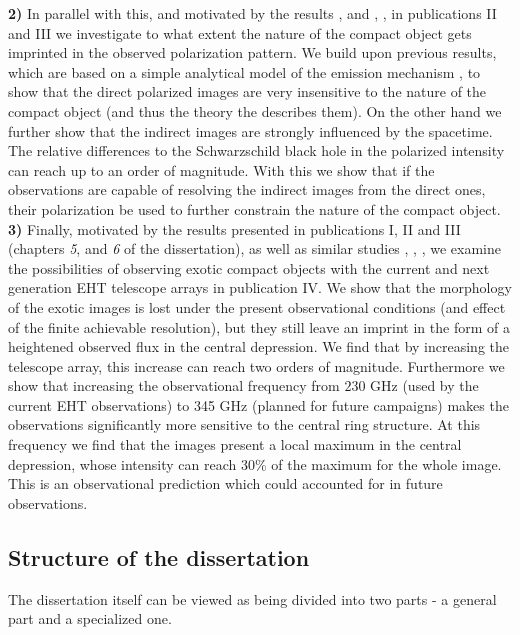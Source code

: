 \documentclass[12pt]{article}
\numberwithin{equation}{section}
\numberwithin{figure}{section}
\begin{document}
	\textbf{2)} In parallel with this, and motivated by the results  \cite{EHT_M87_VII}, \cite{EHT_M87_VIII} and \cite{EHT_SGR_VII}, \cite{EHT_SGR_VIII}, in publications II and III we investigate to what extent the nature of the compact object gets imprinted in the observed polarization pattern. We build upon previous results, which are based on a simple analytical model of the emission mechanism \cite{Narayan2021} \cite{Gelles2021}, to show that the direct polarized images are very insensitive to the nature of the compact object (and thus the theory the describes them). On the other hand we further show that the indirect images are strongly influenced by the spacetime. The relative differences to the Schwarzschild black hole in the polarized intensity can reach up to an order of magnitude. With this we show that if the observations are capable of resolving the indirect images from the direct ones, their polarization be used to further constrain the nature of the compact object.\\
	
	\textbf{3)} Finally, motivated by the results presented in publications I, II and III (chapters \emph{5}, and \emph{6} of the dissertation), as well as similar studies \cite{Eichhorn2022}, \cite{Qin2021}, \cite{Geometric_Modeling}, we examine the possibilities of observing exotic compact objects with the current and next generation EHT telescope arrays in publication IV. We show that the morphology of the exotic images is lost under the present observational conditions (and effect of the finite achievable resolution), but they still leave an imprint in the form of a heightened observed flux in the central depression. We find that by 
	increasing the telescope array, this increase can reach two orders of magnitude. Furthermore we show that increasing the observational frequency from $230$ GHz (used by the current EHT observations) to 345 GHz (planned for future campaigns) makes the observations significantly more sensitive to the central ring structure. At this frequency we find that the images present a local maximum in the central depression, whose intensity can reach 30\% of the maximum for the whole image. This is an observational prediction which could accounted for in future observations.
	
	\subsection{Structure of the dissertation}
	
	The dissertation itself can be viewed as being divided into two parts - a general part and a specialized one.\\
	
\end{document}
